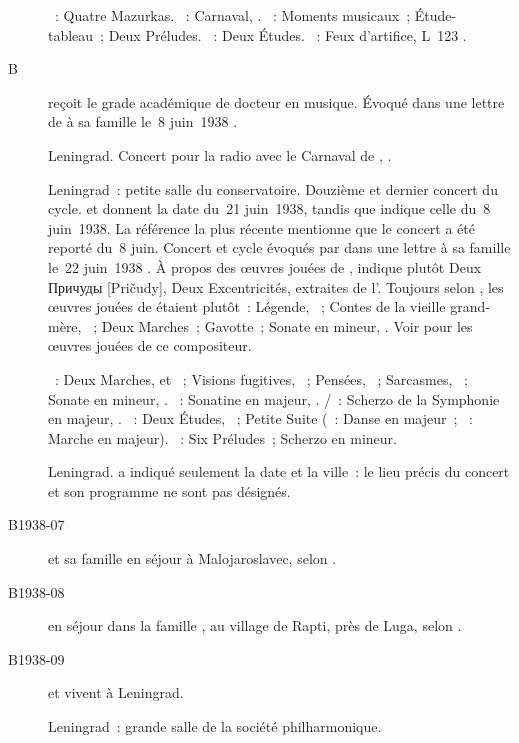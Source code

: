 \begin{description}
 \textsc{\Chopin{}}~: Quatre Mazurkas.
 \textsc{\Schumann{}}~: Carnaval, .
 \textsc{\Rachmaninov{}}~: Moments musicaux~; Étude-tableau~; Deux Préludes.
 \textsc{\Scriabine{}}~: Deux Études.
 \textsc{\Debussy{}}~: Feux d'artifice, L~123 .
 \item[B\DateWithWeekDay{1938-06-07}]
 \VSofronitsky{} reçoit le grade académique de docteur en musique.
 Évoqué dans une lettre de \VSofronitsky{} à sa famille le~8 juin~1938
 \citep[p.~24]{Kogan08}.
 \item[\DateWithWeekDay{1938-06-08}]
 Leningrad.
 Concert pour la radio avec le Carnaval de \Schumann{}, .
 \item[\DateWithWeekDay{1938-06-21}]
 Leningrad~: petite salle du conservatoire.
 Douzième et dernier concert du cycle.
 \citet[p.~159]{Nekrasova08} et \citet[p.~412]{Scriabine} donnent la date
 du~21 juin~1938, tandis que \citet[p.~50]{White} indique celle du~8
 juin~1938.
 La référence la plus récente mentionne que le concert a été reporté du~8
 juin.
 Concert et cycle évoqués par \VSofronitsky{} dans une lettre à sa famille
 le~22 juin~1938 \citep[p.~24]{Kogan08}.
 À propos des œuvres jouées de \Miaskovski{}, \citet[p.~159]{Nekrasova08}
 indique plutôt Deux \foreignlanguage{russian}{Причуды} [Pričudy], \cad{}
 Deux Excentricités, extraites de l'.
 Toujours selon \citeauthor{Nekrasova08}, les œuvres jouées de \Prokofiev{}
 étaient plutôt~: Légende,  ~; Contes de la vieille
 grand-mère, ~; Deux Marches~; Gavotte~; Sonate  en \kA
 mineur, .
 Voir \citet{Bogdanov67a} pour les œuvres jouées de ce compositeur.

 \textsc{\Prokofiev{}}~: Deux Marches,   et 
 ~; Visions fugitives, ~; Pensées, ~; Sarcasmes,
 ~; Sonate  en \kA mineur, .
 \textsc{\Kabalevski{}}~: Sonatine en \kC majeur,  .
 \textsc{\Miaskovski{}/\Alyavdina{}}~: Scherzo de la Symphonie  en
 \kD majeur, .
 \textsc{\BogdanovBerezovsky{}}~: Deux Études, ~; Petite Suite
 (~: Danse en \kA majeur~; ~: Marche en \kD majeur).
 \textsc{\Goltz{}}~: Six Préludes~; Scherzo en \kE mineur.
 \item[\DateWithWeekDay{1938-06-28}]
 Leningrad.
 \ASofronitsky{} a indiqué seulement la date et la ville~: le lieu précis du
 concert et son programme ne sont pas désignés.
 \item[B1938-07]
 \VSofronitsky{} et sa famille en séjour à Malojaroslavec, selon
 \citet[p.~159]{Nekrasova08}.
 \item[B1938-08]
 \VSofronitsky{} en séjour dans la famille \Vizel{}, au village de Rapti,
 près de Luga, selon \citet[p.~159]{Nekrasova08}.
 \item[B1938-09]
 \ESofronitskaya{} et \RKoganSofronitskaya{} vivent à Leningrad.
 \item[\DateWithWeekDay{1938-10-12}]
 Leningrad~: grande salle de la société philharmonique.


\end{description}

